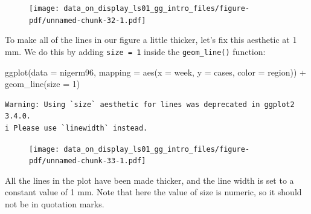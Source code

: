 \documentclass[
  letterpaper,
  DIV=11,
  numbers=noendperiod]{scrreprt}
\newenvironment{Shaded}{\begin{snugshade}}{\end{snugshade}}
\newcommand{\AttributeTok}[1]{\textcolor[rgb]{0.40,0.45,0.13}{#1}}
\newcommand{\DecValTok}[1]{\textcolor[rgb]{0.68,0.00,0.00}{#1}}
\newcommand{\FunctionTok}[1]{\textcolor[rgb]{0.28,0.35,0.67}{#1}}
\newcommand{\NormalTok}[1]{\textcolor[rgb]{0.00,0.23,0.31}{#1}}
\newcommand{\SpecialCharTok}[1]{\textcolor[rgb]{0.37,0.37,0.37}{#1}}
\begin{document}
\begin{figure}[H]

{\centering \texttt{[image: data\_on\_display\_ls01\_gg\_intro\_files/figure-pdf/unnamed-chunk-32-1.pdf]}

}

\end{figure}

To make all of the lines in our figure a little thicker, let's fix this
aesthetic at 1 mm. We do this by adding \texttt{size\ =\ 1} inside the
\texttt{geom\_line()} function:

\begin{Shaded}
\begin{Highlighting}[]
\FunctionTok{ggplot}\NormalTok{(}\AttributeTok{data =}\NormalTok{ nigerm96, }
             \AttributeTok{mapping =} \FunctionTok{aes}\NormalTok{(}\AttributeTok{x =}\NormalTok{ week, }
                           \AttributeTok{y =}\NormalTok{ cases,}
                           \AttributeTok{color =}\NormalTok{ region)) }\SpecialCharTok{+} 
      \FunctionTok{geom\_line}\NormalTok{(}\AttributeTok{size =} \DecValTok{1}\NormalTok{)}
\end{Highlighting}
\end{Shaded}

\begin{verbatim}
Warning: Using `size` aesthetic for lines was deprecated in ggplot2 3.4.0.
i Please use `linewidth` instead.
\end{verbatim}

\begin{figure}[H]

{\centering \texttt{[image: data\_on\_display\_ls01\_gg\_intro\_files/figure-pdf/unnamed-chunk-33-1.pdf]}

}

\end{figure}

All the lines in the plot have been made thicker, and the line width is
set to a constant value of 1 mm. Note that here the value of size is
numeric, so it should not be in quotation marks.
\end{document}
